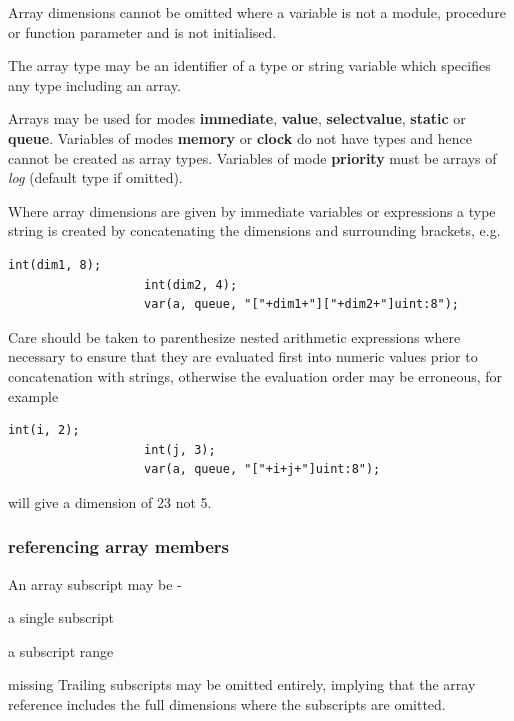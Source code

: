                 Array dimensions cannot be omitted where a variable is not a
                module, procedure or function parameter and is not initialised.
                
                The array type may be an identifier of a type or string variable
                which specifies any type including an array.

                Arrays may be used for modes {\bf immediate}, {\bf value}, {\bf
                selectvalue}, {\bf static} or {\bf queue}. Variables of modes
                {\bf memory} or {\bf clock} do not have types and hence cannot
                be created as array types. Variables of mode {\bf priority}
                must be arrays of {\em log} (default type if omitted).

                Where array dimensions are given by immediate variables or
                expressions a type string is created by concatenating the
                dimensions and surrounding brackets, e.g.
                \begin{lstlisting}[gobble=16, language=threepl]
                   int(dim1, 8);
                   int(dim2, 4);
                   var(a, queue, "["+dim1+"]["+dim2+"]uint:8");
                \end{lstlisting}
                Care should be taken to parenthesize nested arithmetic
                expressions where necessary to ensure that they are evaluated
                first into numeric values prior to concatenation with strings,
                otherwise the evaluation order may be erroneous, for example
                \begin{lstlisting}[gobble=16, language=threepl]
                   int(i, 2);
                   int(j, 3);
                   var(a, queue, "["+i+j+"]uint:8");
                \end{lstlisting}
                will give a dimension of 23 not 5.

            \subsubsection{referencing array members}

                An array subscript may be -
                \blist
                \item    a single subscript
                \item    a subscript range
                \item    missing
                \blend
                Trailing subscripts may be omitted entirely, implying that the
                array reference includes the full dimensions where the
                subscripts are omitted.
                
